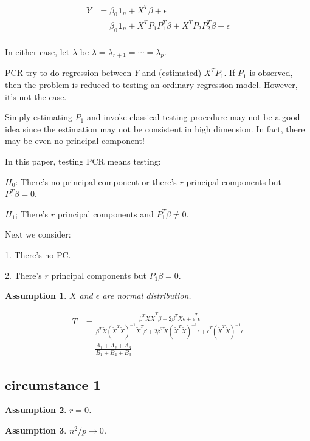 \documentclass[review]{elsarticle}
\theoremstyle{plain}
\newtheorem{assumption}{\quad\quad Assumption}
\theoremstyle{definition}
\theoremstyle{remark}
\begin{document}
\begin{equation}
    \begin{aligned}
        Y&=\beta_0 \textbf{1}_n+X^T\beta+\epsilon\\
        &=\beta_0 \textbf{1}_n+X^T P_1P_1^T\beta+X^T P_2 P_2^T\beta+\epsilon\\
    \end{aligned}
\end{equation}

In either case, let $\lambda$ be $\lambda=\lambda_{r+1}=\cdots=\lambda_{p}$.

PCR try to do regression between $Y$ and (estimated) $X^T P_1$. If $P_1$ is observed, then the problem is reduced to testing an ordinary regression model. However, it's not the case.

Simply estimating $P_1$ and invoke classical testing procedure may not be a good idea since the estimation may not be consistent in high dimension. In fact, there may be even no principal component!

In this paper, testing PCR means testing:

$H_0$: There's no principal component or there's $r$ principal components but $P_1^T \beta =0$.

$H_1$; There's $r$ principal components and $P_1^T \beta \neq 0$.

Next we consider:

1. There's no PC.\@

2. There's $r$ principal components but $P_1\beta=0$.

\begin{assumption}\label{normal}
    $X$ and $\epsilon$ are normal distribution.
\end{assumption}


\begin{equation}
    \begin{aligned}
        T&=\frac{\beta^T \tilde{X}\tilde{X}^T \beta+
        2\beta^T \tilde{X}\tilde{\epsilon}+
        \tilde{\epsilon}^T\tilde{\epsilon}
    }{\beta^T \tilde{X}{(\tilde{X}^T\tilde{X})}^{-1}\tilde{X}^T \beta+
        2\beta^T \tilde{X}{(\tilde{X}^T\tilde{X})}^{-1}\tilde{\epsilon}+
        \tilde{\epsilon}^T{(\tilde{X}^T\tilde{X})}^{-1}\tilde{\epsilon}
    }\\
        &=\frac{A_1+A_2+A_3}{B_1+B_2+B_3}
    \end{aligned}
\end{equation}


\subsection{circumstance 1}
\begin{assumption}
    $r=0$.
\end{assumption}
\begin{assumption}
    $n^2/p\to 0$.
\end{assumption}
\end{document}
